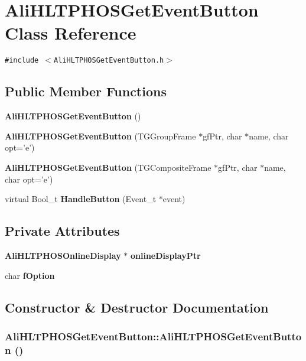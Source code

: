 \section{Ali\-HLTPHOSGet\-Event\-Button Class Reference}
\label{classAliHLTPHOSGetEventButton}
{\tt \#include $<$Ali\-HLTPHOSGet\-Event\-Button.h$>$}

\subsection*{Public Member Functions}
\begin{CompactItemize}
\item 
{\bf Ali\-HLTPHOSGet\-Event\-Button} ()
\item 
{\bf Ali\-HLTPHOSGet\-Event\-Button} (TGGroup\-Frame $\ast$gf\-Ptr, char $\ast$name, char opt='e')
\item 
{\bf Ali\-HLTPHOSGet\-Event\-Button} (TGComposite\-Frame $\ast$gf\-Ptr, char $\ast$name, char opt='e')
\item 
virtual Bool\_\-t {\bf Handle\-Button} (Event\_\-t $\ast$event)
\end{CompactItemize}
\subsection*{Private Attributes}
\begin{CompactItemize}
\item 
{\bf Ali\-HLTPHOSOnline\-Display} $\ast$ {\bf online\-Display\-Ptr}
\item 
char {\bf f\-Option}
\end{CompactItemize}


\subsection{Constructor \& Destructor Documentation}
\subsubsection{\setlength{\rightskip}{0pt plus 5cm}Ali\-HLTPHOSGet\-Event\-Button::Ali\-HLTPHOSGet\-Event\-Button ()}\label{classAliHLTPHOSGetEventButton_a0}





